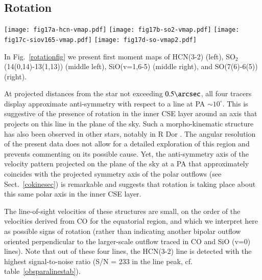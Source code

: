 \documentclass{aa}
\begin{document}
\subsection{Rotation}\label{rotdiskmasssec}

\begin{figure*}[ht]
    \centering
    \texttt{[image: fig17a-hcn-vmap.pdf]}
    \texttt{[image: fig17b-so2-vmap.pdf]}
    \texttt{[image: fig17c-siov165-vmap.pdf]}
    \texttt{[image: fig17d-so-vmap2.pdf]}
    \caption{First moment maps of different lines, indicating a possibly
             rotating structure (see Sect.~\ref{rotdiskmasssec}). 
             Left:         HCN(3-2), 
             middle left:  SO$_2$ (14(0,14)-13(1,13)),
             middle right: SiO(v=1,6-5), 
             right:        SO(7(6)-6(5)).
             The black ellipses indicate the synthesized beam.}
    \label{rotationfig}
\end{figure*}

In Fig.~\ref{rotationfig} we present first moment maps of HCN(3-2)
(left), SO$_2$ (14(0,14)-13(1,13)) (middle left), SiO(v=1,6-5) (middle
right), and SO(7(6)-6(5)) (right).

At projected distances from the star not exceeding $0.5\arcsec$, all
four tracers display approximate anti-symmetry with respect to a line
at PA $\sim 10^\circ$.  This is suggestive of the presence of rotation
in the inner CSE layer around an axis that projects on this line in
the plane of the sky.  Such a morpho-kinematic structure has also been
observed in other stars, notably in R Dor
\citep{2018A&A...613L...4V,hdtetal2018,nhungetal2021}.  The angular
resolution of the present data does not allow for a detailed
exploration of this region and prevents commenting on its possible
cause. Yet, the anti-symmetry axis of the velocity pattern projected
on the plane of the sky at a PA that approximately coincides with the
projected symmetry axis of the polar outflows (see
Sect.~\ref{cokinesec}) is remarkable and suggests that rotation is
taking place about this same polar axis in the inner CSE layer.

The line-of-sight velocities of these structures are small, on the
order of the velocities derived from CO for the equatorial region, and
which we interpret here as possible signs of rotation (rather than
indicating another bipolar outflow oriented perpendicular to the
larger-scale outflow traced in CO and SiO (v=0) lines).  Note that out
of these four lines, the HCN(3-2) line is detected with the highest
signal-to-noise ratio (S/N = 233 in the line peak,
cf. table~\ref{obsparalinestab}).
\end{document}
